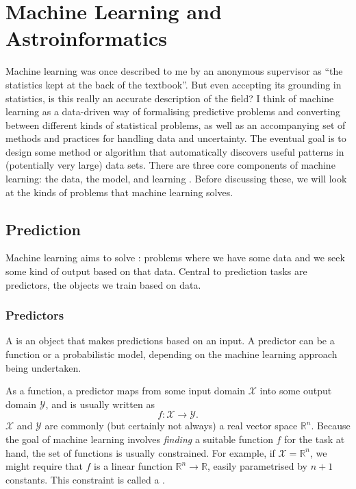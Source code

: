 \chapter{Machine Learning and Astroinformatics}
\label{cha:background-ml}

Machine learning was once described to me by an anonymous supervisor as ``the statistics kept at the back of the textbook''. But even accepting its grounding in statistics, is this really an accurate description of the field? I think of machine learning as a data-driven way of formalising predictive problems and converting between different kinds of statistical problems, as well as an accompanying set of methods and practices for handling data and uncertainty. The eventual goal is to design some method or algorithm that automatically discovers useful patterns in (potentially very large) data sets. There are three core components of machine learning: the data, the model, and learning \citep{deisenroth_mathematics_2020}. Before discussing these, we will look at the kinds of problems that machine learning solves.
    
\section{Prediction}

    Machine learning aims to solve : problems where we have some data and we seek some kind of output based on that data. Central to prediction tasks are predictors, the objects we train based on data.

    \subsection{Predictors}
    \label{sec:predictors}
        A  is an object that makes predictions based on an input. A predictor can be a function or a probabilistic model, depending on the machine learning approach being undertaken.

        As a function, a predictor maps from some input domain $\mathcal X$ into some output domain $\mathcal Y$, and is usually written as
        \begin{equation}
            f : \mathcal X \to \mathcal Y.
        \end{equation}
        $\mathcal X$ and $\mathcal Y$ are commonly (but certainly not always) a real vector space $\mathbb R^n$. Because the goal of machine learning involves \emph{finding} a suitable function $f$ for the task at hand, the set of functions is usually constrained. For example, if $\mathcal X = \mathbb{R}^n$, we might require that $f$ is a linear function $\mathbb R^n \to \mathbb R$, easily parametrised by $n + 1$ constants. This constraint is called a .

